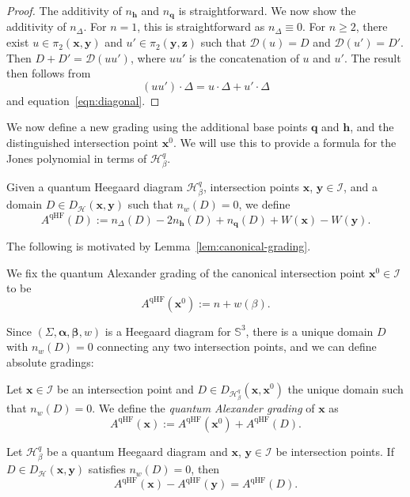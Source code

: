 \documentclass[11pt]{amsart}
\numberwithin{equation}{section}
\numberwithin{figure}{section}
\theoremstyle{definition}
\newcommand{\cD}{\mathcal{D}}
\newcommand{\cH}{\mathcal{H}}
\newcommand{\cI}{\mathcal{I}}
\DeclareMathOperator{\qHF}{qHF}
\newcommand{\as}{\boldsymbol{\alpha}}
\newcommand{\bs}{\boldsymbol{\beta}}
\newcommand{\hs}{\boldsymbol{h}}
\newcommand{\qs}{\boldsymbol{q}}
\newcommand{\xs}{\boldsymbol{x}}
\newcommand{\ys}{\boldsymbol{y}}
\newcommand{\zs}{\boldsymbol{z}}
\begin{document}
\begin{proof}
    The additivity of $n_{\hs}$ and $n_{\qs}$ is straightforward. We now show the additivity of $n_\Delta$. For $n=1$, this is straightforward as $n_\Delta \equiv 0$. For $n \ge 2$, there exist $u \in \pi_2(\xs,\ys)$ and $u' \in \pi_2(\ys,\zs)$ such that $\cD(u) = D$ and $\cD(u') = D'$. Then $D+D' = \cD(u u')$, where $uu'$ is the concatenation of $u$ and $u'$. The result then follows from
    \[
    (u u') \cdot \Delta = u \cdot \Delta + u' \cdot \Delta
    \]
    and equation~\eqref{eqn:diagonal}.
\end{proof}

We now define a new grading using the additional base points $\qs$ and $\hs$, and the distinguished intersection point $\xs^0$. We will use this to provide a formula for the Jones polynomial in terms of $\cH^q_\beta$.

\begin{defn}\label{def:quantum-grading-disc}
Given a quantum Heegaard diagram $\mathcal H^q_{\beta}$, intersection points $\xs$, $\ys \in \cI$, and a domain $D \in D_{\cH}(\xs, \ys)$ such that $n_w(D)=0$, we define
\[
A^{\qHF}(D):= n_\Delta(D)-2n_{\hs}(D) + n_{\qs}(D) + W(\xs) - W(\ys).
\]
\end{defn}

The following is motivated by Lemma~\ref{lem:canonical-grading}.

\begin{defn}\label{def:canonical-quantum-grading}
We fix the quantum Alexander grading of the canonical intersection point $\xs^0 \in \cI$ to be 
\begin{equation}\label{eqgr0}
A^{\qHF}(\xs^0) := n + w(\beta).
\end{equation}
\end{defn}

Since $(\Sigma, \as, \bs, w)$ is a Heegaard diagram for $\mathbb S^3$, there is a unique domain $D$ with $n_w(D)=0$ connecting any two intersection points, and we can define absolute gradings:

\begin{defn}\label{qAlex}
Let $\xs\in \cI$ be an intersection point and $D \in D_{\cH^q_\beta}(\xs, \xs^0)$ the unique domain such that $n_w(D) = 0$. We define the \emph{quantum Alexander grading} of $\xs$ as
\[
A^{\qHF}(\xs):=A^{\qHF}(\xs^0)+A^{\qHF}(D).
\]
\end{defn}

\begin{prop}\label{prop:transitivity}
    Let $\cH^q_\beta$ be a quantum Heegaard diagram and $\xs$, $\ys \in \cI$ be intersection points. If $D \in D_\cH(\xs,\ys)$ satisfies $n_w(D) = 0$, then
    \[
    A^{\qHF}(\xs) - A^{\qHF}(\ys) = A^{\qHF}(D).
    \]
\end{prop}
\end{document}
